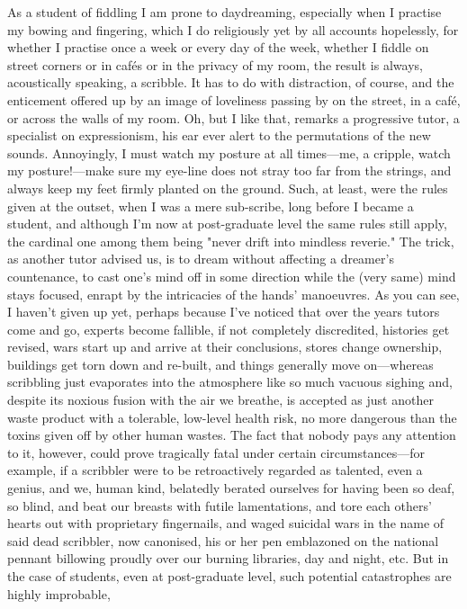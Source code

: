 \documentclass[
]{memoir}
\begin{document}
As a student of fiddling I am prone to daydreaming, especially when I
practise my bowing and fingering, which I do religiously yet by all
accounts hopelessly, for whether I practise once a week or every day of
the week, whether I fiddle on street corners or in cafés or in the
privacy of my room, the result is always, acoustically speaking, a
scribble. It has to do with distraction, of course, and the enticement
offered up by an image of loveliness passing by on the street, in a
café, or across the walls of my room. Oh, but I like that, remarks a
progressive tutor, a specialist on expressionism, his ear ever alert to
the permutations of the new sounds. Annoyingly, I must watch my posture
at all times---me, a cripple, watch my posture!---make sure my eye-line
does not stray too far from the strings, and always keep my feet firmly
planted on the ground. Such, at least, were the rules given at the
outset, when I was a mere sub-scribe, long before I became a student,
and although I'm now at post-graduate level the same rules still apply,
the cardinal one among them being "never drift into mindless reverie."
The trick, as another tutor advised us, is to dream without affecting a
dreamer's countenance, to cast one's mind off in some direction while
the (very same) mind stays focused, enrapt by the intricacies of the
hands' manoeuvres. As you can see, I haven't given up yet, perhaps
because I've noticed that over the years tutors come and go, experts
become fallible, if not completely discredited, histories get revised,
wars start up and arrive at their conclusions, stores change ownership,
buildings get torn down and re-built, and things generally move
on---whereas scribbling just evaporates into the atmosphere like so much
vacuous sighing and, despite its noxious fusion with the air we breathe,
is accepted as just another waste product with a tolerable, low-level
health risk, no more dangerous than the toxins given off by other human
wastes. The fact that nobody pays any attention to it, however, could
prove tragically fatal under certain circumstances---for example, if a
scribbler were to be retroactively regarded as talented, even a genius,
and we, human kind, belatedly berated ourselves for having been so deaf,
so blind, and beat our breasts with futile lamentations, and tore each
others' hearts out with proprietary fingernails, and waged suicidal wars
in the name of said dead scribbler, now canonised, his or her pen
emblazoned on the national pennant billowing proudly over our burning
libraries, day and night, etc. But in the case of students, even at
post-graduate level, such potential catastrophes are highly improbable,
\end{document}

